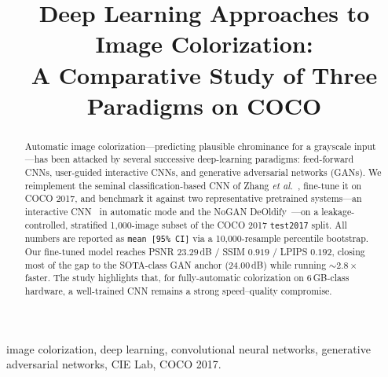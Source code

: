 \documentclass[conference]{IEEEtran}
\begin{document}
\title{Deep Learning Approaches to Image Colorization:\\
A Comparative Study of Three Paradigms on COCO}

\author{}

\maketitle

\begin{abstract}
Automatic image colorization---predicting plausible chrominance for a grayscale
input---has been attacked by several successive deep-learning paradigms:
feed-forward CNNs, user-guided interactive CNNs, and generative adversarial
networks (GANs). We reimplement the seminal classification-based CNN of Zhang
\emph{et al.}~\cite{zhang2016colorful}, fine-tune it on COCO 2017, and
benchmark it against two representative pretrained systems---an interactive
CNN~\cite{zhang2017realtime} in automatic mode and the NoGAN
DeOldify~\cite{antic2019deoldify}---on a leakage-controlled, stratified
1{,}000-image subset of the COCO 2017 \texttt{test2017} split. All numbers are
reported as \texttt{mean [95\% CI]} via a 10{,}000-resample percentile
bootstrap. Our fine-tuned model reaches PSNR $23.29$\,dB / SSIM $0.919$ /
LPIPS $0.192$, closing most of the gap to the SOTA-class GAN anchor
($24.00$\,dB) while running ${\sim}2.8\times$ faster. The study highlights
that, for fully-automatic colorization on 6\,GB-class hardware, a well-trained
CNN remains a strong speed--quality compromise.
\end{abstract}

\begin{IEEEkeywords}
image colorization, deep learning, convolutional neural networks, generative
adversarial networks, CIE Lab, COCO 2017.
\end{IEEEkeywords}











\end{document}
